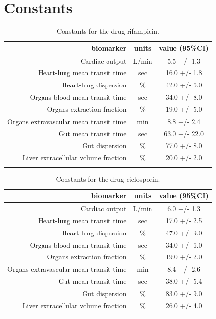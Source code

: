 \documentclass{epflreport}%
\begin{document}
\section{Constants}%
\label{sec:Constants}%

%
\begin{longtable}{rcc}%
\hline%
biomarker&units&value (95\%CI)\\%
\hline%
Cardiac output&L/min&5.5 +/{-} 1.3\\%
Heart{-}lung mean transit time&sec&16.0 +/{-} 1.8\\%
Heart{-}lung dispersion&\%&42.0 +/{-} 6.0\\%
Organs blood mean transit time&sec&34.0 +/{-} 8.0\\%
Organs extraction fraction&\%&19.0 +/{-} 5.0\\%
Organs extravascular mean transit time&min&8.8 +/{-} 2.4\\%
Gut mean transit time&sec&63.0 +/{-} 22.0\\%
Gut dispersion&\%&77.0 +/{-} 8.0\\%
Liver extracellular volume fraction&\%&20.0 +/{-} 2.0\\%
\hline%
\caption{Constants for the drug rifampicin.} \\%
\end{longtable}%
\begin{longtable}{rcc}%
\hline%
biomarker&units&value (95\%CI)\\%
\hline%
Cardiac output&L/min&6.0 +/{-} 1.3\\%
Heart{-}lung mean transit time&sec&17.0 +/{-} 2.5\\%
Heart{-}lung dispersion&\%&47.0 +/{-} 9.0\\%
Organs blood mean transit time&sec&34.0 +/{-} 6.0\\%
Organs extraction fraction&\%&19.0 +/{-} 2.0\\%
Organs extravascular mean transit time&min&8.4 +/{-} 2.6\\%
Gut mean transit time&sec&38.0 +/{-} 5.4\\%
Gut dispersion&\%&83.0 +/{-} 9.0\\%
Liver extracellular volume fraction&\%&26.0 +/{-} 4.0\\%
\hline%
\caption{Constants for the drug ciclosporin.} \\%
\end{longtable}%
\end{document}
